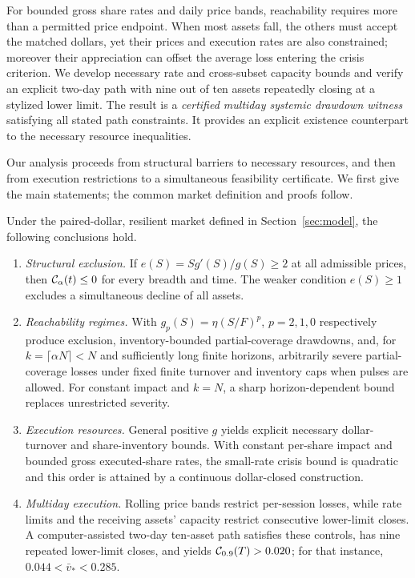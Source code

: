 \documentclass[review,hidelinks,onefignum,onetabnum]{siamonline250211}
\begin{document}
For bounded gross share rates and daily price bands, reachability requires more than a permitted price endpoint. When most assets fall, the others must accept the matched dollars, yet their prices and execution rates are also constrained; moreover their appreciation can offset the average loss entering the crisis criterion. We develop necessary rate and cross-subset capacity bounds and verify an explicit two-day path with nine out of ten assets repeatedly closing at a stylized lower limit. The result is a \emph{certified multiday systemic drawdown witness} satisfying all stated path constraints. It provides an explicit existence counterpart to the necessary resource inequalities.

Our analysis proceeds from structural barriers to necessary resources, and then from execution restrictions to a simultaneous feasibility certificate. We first give the main statements; the common market definition and proofs follow.

\begin{theorem}\label{thm:informal}
Under the paired-dollar, resilient market defined in Section~\ref{sec:model}, the following conclusions hold.
\begin{enumerate}[label=\textup{(\roman*)},leftmargin=2em,itemsep=0.12em]
\item \emph{Structural exclusion.} If $e(S)=Sg'(S)/g(S)\ge2$ at all admissible prices, then $\mathcal{C}_\alpha(t)\le0$ for every breadth and time. The weaker condition $e(S)\ge1$ excludes a simultaneous decline of all assets.
\item \emph{Reachability regimes.} With $g_p(S)=\eta(S/F)^p$, $p=2,1,0$ respectively produce exclusion, inventory-bounded partial-coverage drawdowns, and, for $k=\lceil\alpha N\rceil<N$ and sufficiently long finite horizons, arbitrarily severe partial-coverage losses under fixed finite turnover and inventory caps when pulses are allowed. For constant impact and $k=N$, a sharp horizon-dependent bound replaces unrestricted severity.
\item \emph{Execution resources.} General positive $g$ yields explicit necessary dollar-turnover and share-inventory bounds. With constant per-share impact and bounded gross executed-share rates, the small-rate crisis bound is quadratic and this order is attained by a continuous dollar-closed construction.
\item \emph{Multiday execution.} Rolling price bands restrict per-session losses, while rate limits and the receiving assets' capacity restrict consecutive lower-limit closes. A computer-assisted two-day ten-asset path satisfies these controls, has nine repeated lower-limit closes, and yields $\mathcal{C}_{0.9}(T)>0.020$; for that instance, $0.044<\bar v_*<0.285$.
\end{enumerate}
\end{theorem}
\end{document}
